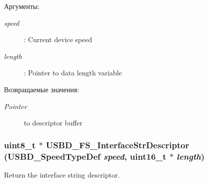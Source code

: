 \begin{Desc}
\item[Аргументы:]
\begin{description}
\item[{\em speed}]: Current device speed \item[{\em length}]: Pointer to data length variable \end{description}
\end{Desc}
\begin{Desc}
\item[Возвращаемые значения:]
\begin{description}
\item[{\em Pointer}]to descriptor buffer \end{description}
\end{Desc}
\hypertarget{group___u_s_b_d___d_e_s_c___private___functions_gb248f43276f92d982ab5853111e4fb10}{
\subsubsection[{USBD\_\-FS\_\-InterfaceStrDescriptor}]{\setlength{\rightskip}{0pt plus 5cm}uint8\_\-t $\ast$ USBD\_\-FS\_\-InterfaceStrDescriptor (USBD\_\-SpeedTypeDef {\em speed}, \/  uint16\_\-t $\ast$ {\em length})}}
\label{group___u_s_b_d___d_e_s_c___private___functions_gb248f43276f92d982ab5853111e4fb10}


Return the interface string descriptor. 

